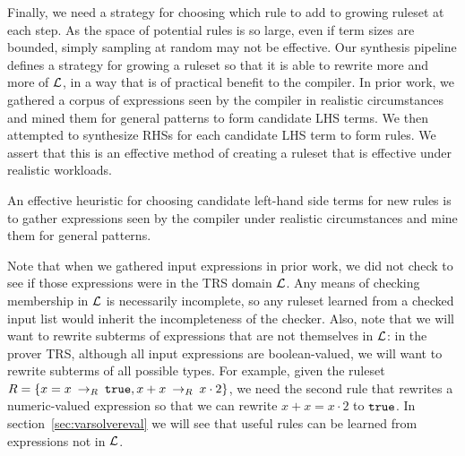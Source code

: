 

Finally, we need a strategy for choosing which rule to add to growing ruleset at each step. As the space of potential rules is so large, even if term sizes are bounded, simply sampling at random may not be effective. Our synthesis pipeline defines a strategy for growing a ruleset so that it is able to rewrite more and more of $\mathcal{L}$, in a way that is of practical benefit to the compiler. In prior work, we gathered a corpus of expressions seen by the compiler in realistic circumstances and mined them for general patterns to form candidate LHS terms. We then attempted to synthesize RHSs for each candidate LHS term to form rules. We assert that this is an effective method of creating a ruleset that is effective under realistic workloads.

\begin{assumption}
An effective heuristic for choosing candidate left-hand side terms for new rules is to gather expressions seen by the compiler under realistic circumstances and mine them for general patterns.
\end{assumption}

Note that when we gathered input expressions in prior work, we did not check to see if those expressions were in the TRS domain $\mathcal{L}$. Any means of checking membership in $\mathcal{L}$ is necessarily incomplete, so any ruleset learned from a checked input list would inherit the incompleteness of the checker. Also, note that we will want to rewrite subterms of expressions that are not themselves in $\mathcal{L}$: in the prover TRS, although all input expressions are boolean-valued, we will want to rewrite subterms of all possible types. For example, given the ruleset $R = \{x = x \:\rightarrow_{R}\: \texttt{true}, x + x \:\rightarrow_{R}\: x \cdot 2\}$, we need the second rule that rewrites a numeric-valued expression so that we can rewrite $x + x = x \cdot 2$ to $\texttt{true}$. In section~\ref{sec:varsolvereval} we will see that useful rules can be learned from expressions not in $\mathcal{L}$.

